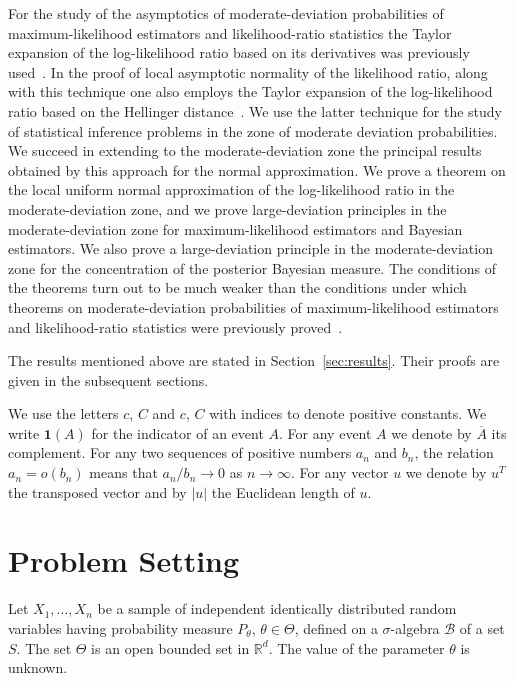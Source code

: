 \documentclass[11pt,a4paper]{article}
\begin{document}
For the study of the asymptotics of moderate-deviation probabilities of maximum-likelihood estimators and likelihood-ratio statistics the Taylor expansion of the log-likelihood ratio based on its derivatives was previously used~\cite{1,2,8,11,14,17}. In the proof of local asymptotic normality of the likelihood ratio, along with this technique one also employs the Taylor expansion of the log-likelihood ratio based on the Hellinger distance~\cite{9,10,13,18}. We use the latter technique for the study of statistical inference problems in the zone of moderate deviation probabilities. We succeed in extending to the moderate-deviation zone the principal results obtained by this approach for the normal approximation. We prove a theorem on the local uniform normal approximation of the log-likelihood ratio in the moderate-deviation zone, and we prove large-deviation principles in the moderate-deviation zone for maximum-likelihood estimators and Bayesian estimators. We also prove a large-deviation principle in the moderate-deviation zone for the concentration of the posterior Bayesian measure. The conditions of the theorems turn out to be much weaker than the conditions under which theorems on moderate-deviation probabilities of maximum-likelihood estimators and likelihood-ratio statistics were previously proved~\cite{1,2,8,11,14,17}.

The results mentioned above are stated in Section~\ref{sec:results}. Their proofs are given in the subsequent sections.

We use the letters $c$, $C$ and $c$, $C$ with indices to denote positive constants. We write $\mathbf{1}(A)$ for the indicator of an event $A$. For any event $A$ we denote by $\overline{A}$ its complement. For any two sequences of positive numbers $a_n$ and $b_n$, the relation $a_n=o(b_n)$ means that $a_n/b_n\to 0$ as $n\to\infty$. For any vector $u$ we denote by $u^T$ the transposed vector and by $|u|$ the Euclidean length of $u$.

\section{Problem Setting}
\label{sec:setting}

Let $X_1,\dots,X_n$ be a sample of independent identically distributed random variables having probability measure $P_\theta$, $\theta\in\Theta$, defined on a $\sigma$-algebra $\mathcal{B}$ of a set $S$. The set $\Theta$ is an open bounded set in $\mathbb{R}^d$. The value of the parameter $\theta$ is unknown.
\end{document}
